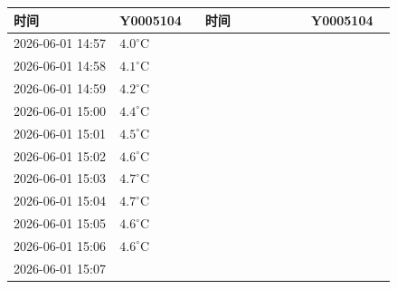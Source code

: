 \documentclass[UTF8,10pt,a4paper,fontset=fandol]{ctexart}
\newcommand{\fieldvalue}[1]{#1}
\begin{document}
\small
\begin{tabular}{|p{0.24\linewidth}|p{0.18\linewidth}|p{0.24\linewidth}|p{0.18\linewidth}|}
\hline
时间 & Y0005104 & 时间 & Y0005104 \\ \hline
\fieldvalue{2026-06-01 14:57} &
\fieldvalue{$4.0^\circ\mathrm{C}$} & & \\ \hline
\fieldvalue{2026-06-01 14:58} &
\fieldvalue{$4.1^\circ\mathrm{C}$} & & \\ \hline
\fieldvalue{2026-06-01 14:59} &
\fieldvalue{$4.2^\circ\mathrm{C}$} & & \\ \hline
\fieldvalue{2026-06-01 15:00} &
\fieldvalue{$4.4^\circ\mathrm{C}$} & & \\ \hline
\fieldvalue{2026-06-01 15:01} &
\fieldvalue{$4.5^\circ\mathrm{C}$} & & \\ \hline
\fieldvalue{2026-06-01 15:02} &
\fieldvalue{$4.6^\circ\mathrm{C}$} & & \\ \hline
\fieldvalue{2026-06-01 15:03} &
\fieldvalue{$4.7^\circ\mathrm{C}$} & & \\ \hline
\fieldvalue{2026-06-01 15:04} &
\fieldvalue{$4.7^\circ\mathrm{C}$} & & \\ \hline
\fieldvalue{2026-06-01 15:05} &
\fieldvalue{$4.6^\circ\mathrm{C}$} & & \\ \hline
\fieldvalue{2026-06-01 15:06} &
\fieldvalue{$4.6^\circ\mathrm{C}$} & & \\ \hline
\fieldvalue{2026-06-01 15:07} &

\end{tabular}
\end{document}
